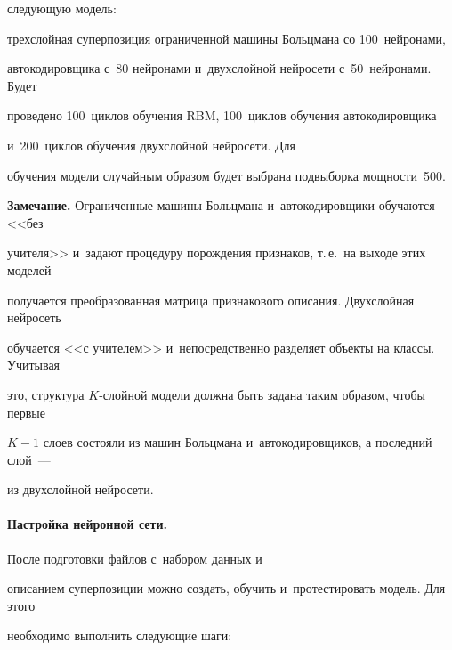 следующую модель: 


трехслойная суперпозиция ограниченной машины Больцмана со 100~нейронами, 


автокодировщика с~80 нейронами и~двухслойной нейросети с~50~нейронами.  Будет 


проведено 100~циклов обучения RBM, 100~циклов обучения автокодировщика 


и~200~циклов обучения двухслойной нейросети. Для 


обучения модели случайным образом будет выбрана подвыборка мощ\-ности~500.





\smallskip





\noindent


\textbf{Замечание.} Ограниченные машины Больцмана и~автокодировщики обучаются <<без 


учителя>> и~задают процедуру порождения признаков, т.\,е.\ на выходе этих моделей 


получается преобразованная матрица признакового описания. Двухслойная нейросеть 


обучается <<с учителем>> и~непосредственно разделяет объекты на классы. Учитывая 


это, структура $K$-слой\-ной модели должна быть задана таким образом, чтобы первые 


$K-1$ слоев состояли из машин Больцмана и~автокодировщиков, а последний слой~--- 


из двухслойной нейросети.





\vspace*{-9pt}





\paragraph*{Настройка нейронной сети.} После подготовки файлов с~набором данных и~


описанием суперпозиции можно создать, обучить и~протестировать модель. Для этого 


необходимо выполнить следующие шаги:


